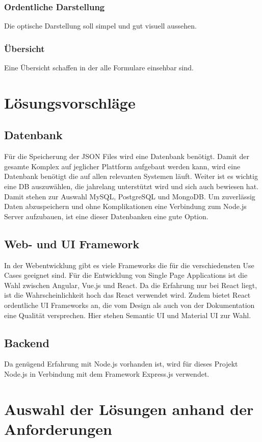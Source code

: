 \documentclass[a4paper,11pt]{scrreprt}
\begin{document}
\subsection{Ordentliche Darstellung}
Die optische Darstellung soll simpel und gut visuell aussehen.
\subsection{Übersicht}
Eine Übersicht schaffen in der alle Formulare einsehbar sind. 
 

\chapter{Lösungsvorschläge}
\section{Datenbank}
Für die Speicherung der JSON Files wird eine Datenbank benötigt. Damit der gesamte Komplex auf jeglicher Plattform aufgebaut werden kann, wird eine Datenbank benötigt die auf allen relevanten Systemen läuft. Weiter ist es wichtig eine DB auszuwählen, die jahrelang unterstützt wird und sich auch bewiesen hat. Damit stehen zur Auswahl MySQL, PostgreSQL und MongoDB. Um zuverlässig Daten abzuspeichern und ohne Komplikationen eine Verbindung zum Node.js Server aufzubauen, ist eine dieser Datenbanken eine gute Option. 


\section{Web- und UI Framework}
In der Webentwicklung gibt es viele Frameworks die für die verschiedensten Use Cases geeignet sind. Für die Entwicklung von Single Page Applications ist die Wahl zwischen Angular, Vue.js und React. Da die Erfahrung nur bei React liegt, ist die Wahrscheinlichkeit hoch das React verwendet wird. Zudem bietet React ordentliche UI Frameworks an, die vom Design als auch von der Dokumentation eine Qualität versprechen. Hier stehen Semantic UI und Material UI zur Wahl.


\section{Backend}
Da genügend Erfahrung mit Node.js vorhanden ist, wird für dieses Projekt Node.js in Verbindung mit dem Framework Express.js verwendet. 



\chapter{Auswahl der Lösungen anhand der Anforderungen}
\end{document}
